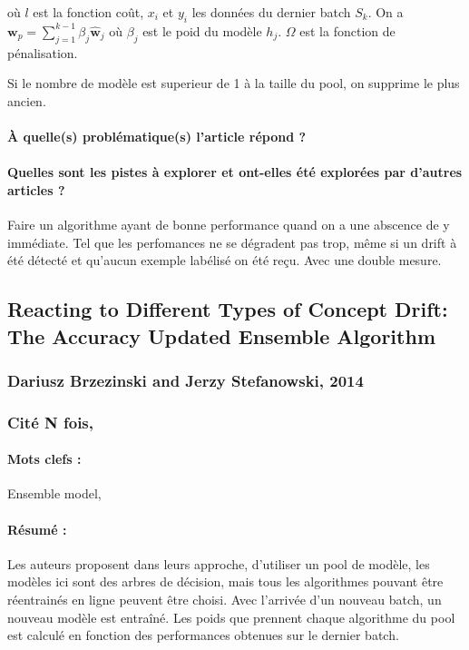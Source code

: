 \documentclass[11pt,a4paper]{report}
\begin{document}
où $l$ est la fonction coût, $x_i$ et $y_i$ les données du dernier batch $S_k$. On a $\mathbf{w}_{p}=\sum_{j=1}^{k-1} \beta_{j} \hat{\mathbf{w}}_{j}$ où $\beta_j$ est le poid du modèle $h_j$. $\Omega$ est la fonction de pénalisation.

Si le nombre de modèle est superieur de 1 à la taille du pool, on supprime le plus ancien.

\paragraph{À quelle(s) problématique(s) l'article répond ?} 

\paragraph{Quelles sont les pistes à explorer et ont-elles  été explorées par d'autres articles ?}  Faire un algorithme ayant de bonne performance quand on a une abscence de y immédiate. Tel que les perfomances ne se dégradent pas trop, même si un drift à été détecté et qu'aucun exemple labélisé on été reçu. Avec une double mesure.








\subsection{Reacting to Different Types of Concept Drift: The Accuracy Updated Ensemble Algorithm}
\subsubsection{Dariusz Brzezinski and Jerzy Stefanowski, 2014}

\subsubsection{Cité N fois, }

\paragraph{Mots clefs :} Ensemble model,

\paragraph{Résumé :} Les auteurs proposent dans leurs approche, d'utiliser un pool de modèle, les modèles ici sont des arbres de décision, mais tous les algorithmes pouvant être réentrainés en ligne peuvent être choisi. Avec l'arrivée d'un nouveau batch, un nouveau modèle est entraîné. Les poids que prennent chaque algorithme du pool est calculé en fonction des performances obtenues sur le dernier batch. 
\end{document}
